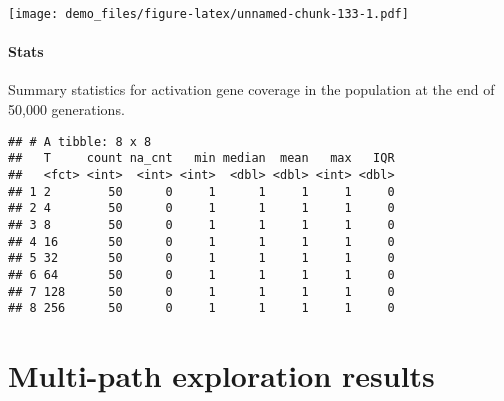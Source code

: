 \documentclass[]{book}
\newenvironment{Shaded}{\begin{snugshade}}{\end{snugshade}}
\newcommand{\DataTypeTok}[1]{\textcolor[rgb]{0.13,0.29,0.53}{#1}}
\newcommand{\KeywordTok}[1]{\textcolor[rgb]{0.13,0.29,0.53}{\textbf{#1}}}
\newcommand{\NormalTok}[1]{#1}
\newcommand{\OperatorTok}[1]{\textcolor[rgb]{0.81,0.36,0.00}{\textbf{#1}}}
\newcommand{\OtherTok}[1]{\textcolor[rgb]{0.56,0.35,0.01}{#1}}
\newcommand{\StringTok}[1]{\textcolor[rgb]{0.31,0.60,0.02}{#1}}
\let\oldparagraph\paragraph
\renewcommand{\paragraph}[1]{\oldparagraph{#1}\mbox{}}
\begin{document}
\texttt{[image: demo\_files/figure-latex/unnamed-chunk-133-1.pdf]}

\hypertarget{stats-25}{%
\paragraph{Stats}\label{stats-25}}

Summary statistics for activation gene coverage in the population at the end of 50,000 generations.

\begin{Shaded}
\end{Shaded}

\begin{verbatim}
## # A tibble: 8 x 8
##   T     count na_cnt   min median  mean   max   IQR
##   <fct> <int>  <int> <int>  <dbl> <dbl> <int> <dbl>
## 1 2        50      0     1      1     1     1     0
## 2 4        50      0     1      1     1     1     0
## 3 8        50      0     1      1     1     1     0
## 4 16       50      0     1      1     1     1     0
## 5 32       50      0     1      1     1     1     0
## 6 64       50      0     1      1     1     1     0
## 7 128      50      0     1      1     1     1     0
## 8 256      50      0     1      1     1     1     0
\end{verbatim}

\hypertarget{multi-path-exploration-results-2}{%
\section{Multi-path exploration results}\label{multi-path-exploration-results-2}}
\end{document}
